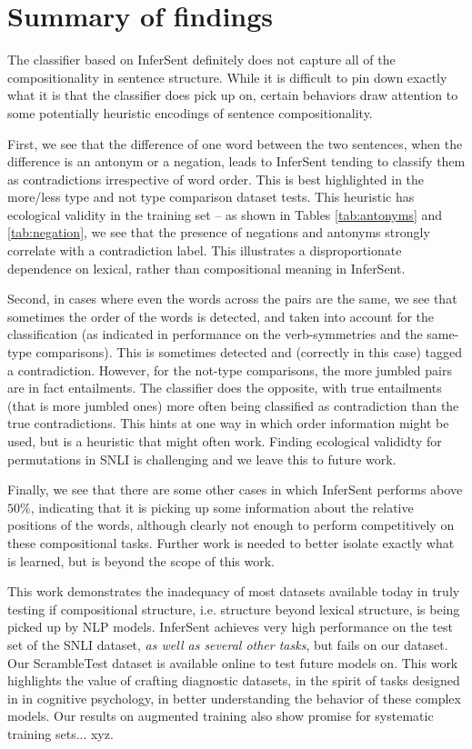 \documentclass[10pt,letterpaper]{article}
\begin{document}
\section{Summary of findings}
The classifier based on InferSent definitely does not capture all of the compositionality in sentence structure. While it is difficult to pin down exactly what it is that the classifier does pick up on, certain behaviors draw attention to some potentially heuristic encodings of sentence compositionality. 

First, we see that the difference of one word between the two sentences, when the difference is an antonym or a negation, leads to InferSent tending to classify them as contradictions irrespective of word order. This is best highlighted in the more/less type and not type comparison dataset tests. This heuristic has ecological validity in the training set – as shown in Tables \ref{tab:antonyms} and \ref{tab:negation}, we see that the presence of negations and antonyms strongly correlate with a contradiction label. This illustrates a disproportionate dependence on lexical, rather than compositional meaning in InferSent. 

Second, in cases where even the words across the pairs are the same, we see that sometimes the order of the words is detected, and taken into account for the classification (as indicated in performance on the verb-symmetries and the same-type comparisons). This is sometimes detected and (correctly in this case) tagged a contradiction. However, for the not-type comparisons, the more jumbled pairs are in fact entailments. The classifier does the opposite, with true entailments (that is more jumbled ones) more often being classified as contradiction than the true contradictions. This hints at one way in which order information might be used, but is a heuristic that might often work. Finding ecological valididty for permutations in SNLI is challenging and we leave this to future work.

Finally, we see that there are some other cases in which InferSent performs above $50\%$, indicating that it is picking up some information about the relative positions of the words, although clearly not enough to perform competitively on these compositional tasks. Further work is needed to better isolate exactly what is learned, but is beyond the scope of this work.

This work demonstrates the inadequacy of most datasets available today in truly testing if compositional structure, i.e. structure beyond lexical structure, is being picked up by NLP models. InferSent achieves very high performance on the test set of the SNLI dataset, \textit{as well as several other tasks}, but fails on our dataset. Our ScrambleTest dataset is available online to test future models on. This work highlights the value of crafting diagnostic datasets, in the spirit of tasks designed in in cognitive psychology, in better understanding the behavior of these complex models. Our results on augmented training also show promise for systematic training sets... xyz.
\end{document}
